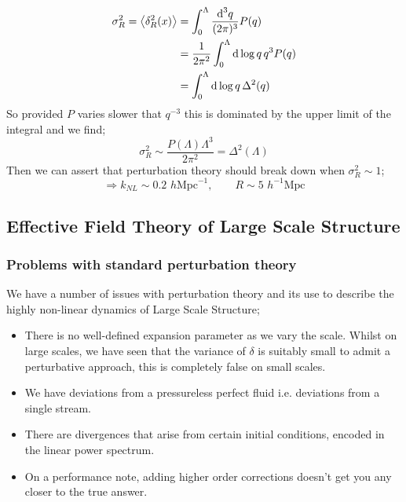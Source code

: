 \begin{align*}
\sigma_R^2 = \left< \delta^2_R(x) \right> &= \int_{0}^{\Lambda}{\frac{\ud^3 q}{(2\pi)^3}P(q)} \\
&= \frac{1}{2\pi^2}\int_0^{\Lambda}{\upd{\log q}q^3 P(q)} \\
&= \int_0^{\Lambda}{\upd{\log q}\Delta^2(q)}
\end{align*}
So provided $P$ varies slower that $q^{-3}$ this is dominated by the upper limit of the integral and we find;
\begin{equation}
\sigma_R^2 \sim \frac{P(\Lambda)\Lambda^3}{2\pi^2} = \Delta^2(\Lambda)
\end{equation}
Then we can assert that perturbation theory should break down when $\sigma_R^2 \sim 1$;
\begin{equation*}
\Rightarrow k_{NL} \sim 0.2 \,\,h\text{Mpc}^{-1}, \qquad R \sim 5\,\,h^{-1}\text{Mpc}
\end{equation*}
\subsection{Effective Field Theory of Large Scale Structure}
\subsubsection{Problems with standard perturbation theory}
We have a number of issues with perturbation theory and its use to describe the highly non-linear dynamics of Large Scale Structure;
\begin{itemize}
\item There is no well-defined expansion parameter as we vary the scale. Whilst on large scales, we have seen that the variance of $\delta$ is suitably small to admit a perturbative approach, this is completely false on small scales.
\item We have deviations from a pressureless perfect fluid i.e. deviations from a single stream.
\item There are divergences that arise from certain initial conditions, encoded in the linear power spectrum.
\item On a performance note, adding higher order corrections doesn't get you any closer to the true answer.
\end{itemize}
